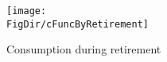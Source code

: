 \begin{figure}[h]
	\centering
	\texttt{[image: \\FigDir/cFuncByRetirement]}
	\caption{Consumption during retirement}
	\label{fig:cFuncByRetirement}
\end{figure}
